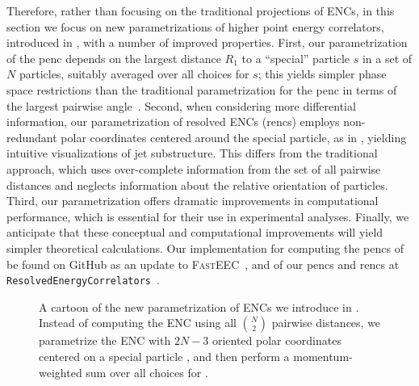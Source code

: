 Therefore, rather than focusing on the traditional projections of ENCs, in this section we focus on new parametrizations of higher point energy correlators, introduced in , with a number of improved properties.
%
First, our parametrization of the \gls{penc} depends on the largest distance \(R_1\) to a ``special'' particle $s$ in a set of $N$ particles, suitably averaged over all choices for $s$;
%
this yields simpler phase space restrictions than the traditional parametrization for the \gls{penc} in terms of the largest pairwise angle~\cite{Chen:2020vvp}.
%
Second, when considering more differential information, our parametrization of resolved ENCs (\gls{renc}s) employs non-redundant polar coordinates centered around the special particle, as in , yielding intuitive visualizations of jet substructure.
%
This differs from the traditional approach, which uses over-complete information from the set of all pairwise distances and neglects information about the relative orientation of particles.
%
Third, our parametrization offers dramatic improvements in computational performance, which is essential for their use in experimental analyses.
%
Finally, we anticipate that these conceptual and computational improvements will yield simpler theoretical calculations.
%
Our implementation for computing the \glspl{penc} of  be found on GitHub as an update to \textsc{FastEEC}~\cite{FASTEEC}, and of our \glspl{penc} and \gls{renc}s at \texttt{ResolvedEnergyCorrelators}~\cite{github:RENC}.


\begin{figure}
    \centering
    \scalebox{1.2}{
        
    }
    \caption[Cartoon of the new parametrization of ENCs introduced by the author and collaborators]{
        A cartoon of the new parametrization of ENCs we introduce in .
        Instead of computing the ENC using all \(\binom{N}{2}\) pairwise distances, we parametrize the ENC with \(2N - 3\) oriented polar coordinates centered on a special particle \izero{}, and then perform a momentum-weighted sum over all choices for \izero{}.
    }
	\label{fig:cartoon}
\end{figure}


